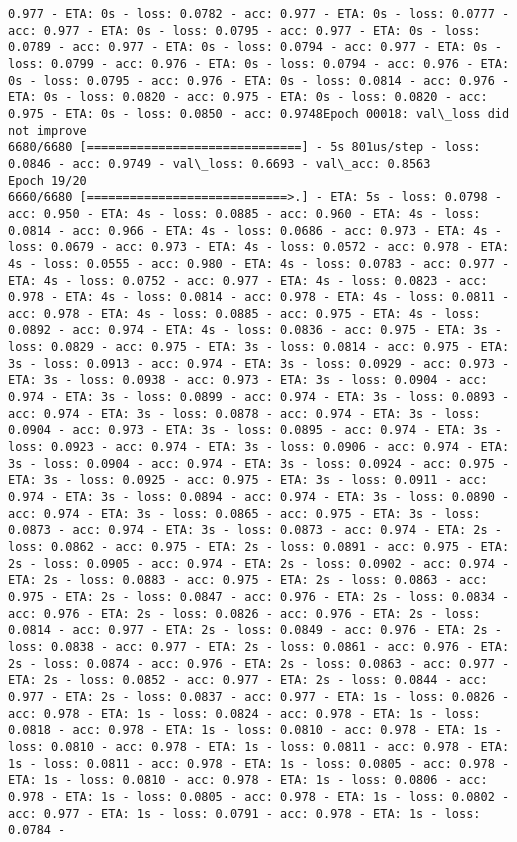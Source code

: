 \documentclass[11pt]{article}
\begin{document}
\begin{Verbatim}[commandchars=\\\{\}]
0.977 - ETA: 0s - loss: 0.0782 - acc: 0.977 - ETA: 0s - loss: 0.0777 - acc: 0.977 - ETA: 0s - loss: 0.0795 - acc: 0.977 - ETA: 0s - loss: 0.0789 - acc: 0.977 - ETA: 0s - loss: 0.0794 - acc: 0.977 - ETA: 0s - loss: 0.0799 - acc: 0.976 - ETA: 0s - loss: 0.0794 - acc: 0.976 - ETA: 0s - loss: 0.0795 - acc: 0.976 - ETA: 0s - loss: 0.0814 - acc: 0.976 - ETA: 0s - loss: 0.0820 - acc: 0.975 - ETA: 0s - loss: 0.0820 - acc: 0.975 - ETA: 0s - loss: 0.0850 - acc: 0.9748Epoch 00018: val\_loss did not improve
6680/6680 [==============================] - 5s 801us/step - loss: 0.0846 - acc: 0.9749 - val\_loss: 0.6693 - val\_acc: 0.8563
Epoch 19/20
6660/6680 [============================>.] - ETA: 5s - loss: 0.0798 - acc: 0.950 - ETA: 4s - loss: 0.0885 - acc: 0.960 - ETA: 4s - loss: 0.0814 - acc: 0.966 - ETA: 4s - loss: 0.0686 - acc: 0.973 - ETA: 4s - loss: 0.0679 - acc: 0.973 - ETA: 4s - loss: 0.0572 - acc: 0.978 - ETA: 4s - loss: 0.0555 - acc: 0.980 - ETA: 4s - loss: 0.0783 - acc: 0.977 - ETA: 4s - loss: 0.0752 - acc: 0.977 - ETA: 4s - loss: 0.0823 - acc: 0.978 - ETA: 4s - loss: 0.0814 - acc: 0.978 - ETA: 4s - loss: 0.0811 - acc: 0.978 - ETA: 4s - loss: 0.0885 - acc: 0.975 - ETA: 4s - loss: 0.0892 - acc: 0.974 - ETA: 4s - loss: 0.0836 - acc: 0.975 - ETA: 3s - loss: 0.0829 - acc: 0.975 - ETA: 3s - loss: 0.0814 - acc: 0.975 - ETA: 3s - loss: 0.0913 - acc: 0.974 - ETA: 3s - loss: 0.0929 - acc: 0.973 - ETA: 3s - loss: 0.0938 - acc: 0.973 - ETA: 3s - loss: 0.0904 - acc: 0.974 - ETA: 3s - loss: 0.0899 - acc: 0.974 - ETA: 3s - loss: 0.0893 - acc: 0.974 - ETA: 3s - loss: 0.0878 - acc: 0.974 - ETA: 3s - loss: 0.0904 - acc: 0.973 - ETA: 3s - loss: 0.0895 - acc: 0.974 - ETA: 3s - loss: 0.0923 - acc: 0.974 - ETA: 3s - loss: 0.0906 - acc: 0.974 - ETA: 3s - loss: 0.0904 - acc: 0.974 - ETA: 3s - loss: 0.0924 - acc: 0.975 - ETA: 3s - loss: 0.0925 - acc: 0.975 - ETA: 3s - loss: 0.0911 - acc: 0.974 - ETA: 3s - loss: 0.0894 - acc: 0.974 - ETA: 3s - loss: 0.0890 - acc: 0.974 - ETA: 3s - loss: 0.0865 - acc: 0.975 - ETA: 3s - loss: 0.0873 - acc: 0.974 - ETA: 3s - loss: 0.0873 - acc: 0.974 - ETA: 2s - loss: 0.0862 - acc: 0.975 - ETA: 2s - loss: 0.0891 - acc: 0.975 - ETA: 2s - loss: 0.0905 - acc: 0.974 - ETA: 2s - loss: 0.0902 - acc: 0.974 - ETA: 2s - loss: 0.0883 - acc: 0.975 - ETA: 2s - loss: 0.0863 - acc: 0.975 - ETA: 2s - loss: 0.0847 - acc: 0.976 - ETA: 2s - loss: 0.0834 - acc: 0.976 - ETA: 2s - loss: 0.0826 - acc: 0.976 - ETA: 2s - loss: 0.0814 - acc: 0.977 - ETA: 2s - loss: 0.0849 - acc: 0.976 - ETA: 2s - loss: 0.0838 - acc: 0.977 - ETA: 2s - loss: 0.0861 - acc: 0.976 - ETA: 2s - loss: 0.0874 - acc: 0.976 - ETA: 2s - loss: 0.0863 - acc: 0.977 - ETA: 2s - loss: 0.0852 - acc: 0.977 - ETA: 2s - loss: 0.0844 - acc: 0.977 - ETA: 2s - loss: 0.0837 - acc: 0.977 - ETA: 1s - loss: 0.0826 - acc: 0.978 - ETA: 1s - loss: 0.0824 - acc: 0.978 - ETA: 1s - loss: 0.0818 - acc: 0.978 - ETA: 1s - loss: 0.0810 - acc: 0.978 - ETA: 1s - loss: 0.0810 - acc: 0.978 - ETA: 1s - loss: 0.0811 - acc: 0.978 - ETA: 1s - loss: 0.0811 - acc: 0.978 - ETA: 1s - loss: 0.0805 - acc: 0.978 - ETA: 1s - loss: 0.0810 - acc: 0.978 - ETA: 1s - loss: 0.0806 - acc: 0.978 - ETA: 1s - loss: 0.0805 - acc: 0.978 - ETA: 1s - loss: 0.0802 - acc: 0.977 - ETA: 1s - loss: 0.0791 - acc: 0.978 - ETA: 1s - loss: 0.0784 - 
\end{Verbatim}
\end{document}

